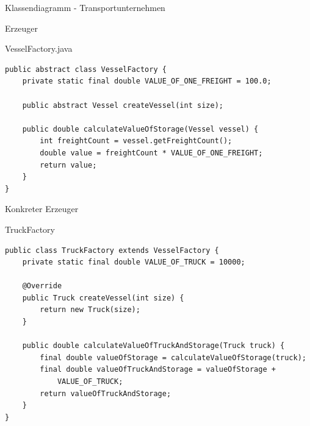 \begin{frame}{Klassendiagramm - Transportunternehmen}
\end{frame}

\begin{frame}[fragile]{Erzeuger}
	\begin{exampleblock}{VesselFactory.java}
 		\begin{lstlisting}
public abstract class VesselFactory {
	private static final double VALUE_OF_ONE_FREIGHT = 100.0;
	
	public abstract Vessel createVessel(int size);
	
	public double calculateValueOfStorage(Vessel vessel) {
		int freightCount = vessel.getFreightCount();
		double value = freightCount * VALUE_OF_ONE_FREIGHT;
		return value;
	}
} 		    
 		\end{lstlisting}
 	\end{exampleblock}
\end{frame}

\begin{frame}[fragile]{Konkreter Erzeuger}
	\begin{exampleblock}{TruckFactory}
 		\begin{lstlisting}
public class TruckFactory extends VesselFactory {
	private static final double VALUE_OF_TRUCK = 10000;
	
	@Override
	public Truck createVessel(int size) {
		return new Truck(size);
	}

	public double calculateValueOfTruckAndStorage(Truck truck) {
		final double valueOfStorage = calculateValueOfStorage(truck);
		final double valueOfTruckAndStorage = valueOfStorage + 
            VALUE_OF_TRUCK;
		return valueOfTruckAndStorage;
	}
}
 		\end{lstlisting}
 	\end{exampleblock}
\end{frame}

